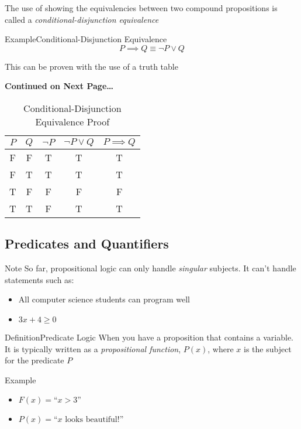 \documentclass{MathNotes}
\newenvironment{example}[1]{\begin{BlueBox}{Example}{#1}}{\end{BlueBox}}
\newenvironment{definition}[1]{\begin{RedBox}{Definition}{#1}}{\end{RedBox}}
\newenvironment{note}[1]{\begin{YellowBox}{Note}{#1}}{\end{YellowBox}}
\newcommand{\continued}{
	\mbox{}
	\vfill
	\textbf{Continued on Next Page\ldots}\newpage
}
\begin{document}
The use of showing the equivalencies between two compound propositions is called a
\textit{conditional-disjunction equivalence}
\begin{example}{Conditional-Disjunction Equivalence}\label{ex:conditional-disjunction-equivalence}
	\[P\implies Q\equiv\lnot P\lor Q\]
\end{example}

This can be proven with the use of a truth table 
\continued

\begin{table}[h!]\label{tab:conditional-disjunction-equivalence}
	\centering
	\caption{Conditional-Disjunction Equivalence Proof}
	\begin{tabular}{cc|c|c|c}
		$P$ & $Q$ & $\lnot P$ & $\lnot P\lor Q$ & $P\implies Q$ \\
		\midrule
		F   & F   & T         & T               & T             \\
		F   & T   & T         & T               & T             \\
		T   & F   & F         & F               & F             \\
		T   & T   & F         & T               & T             \\
	\end{tabular}
\end{table}

\subsection{Predicates and Quantifiers}\label{sec:predicates-quantifiers}

\begin{note}{}
	So far, propositional logic can only handle \textit{singular} subjects. It can't handle statements such as:
	\begin{itemize}
		\item All computer science students can program well
		\item $3x+4\geq0$
	\end{itemize}
\end{note}

\begin{multicols}{2}
	\begin{definition}{Predicate Logic}\label{def:pred-logic}
		When you have a proposition that contains a variable. It is typically written as a \textit{propositional function}, $P(x)$, where $x$ is the subject for the predicate $P$
	\end{definition}

	\begin{example}{}\label{ex:pred-logic}
		\begin{itemize}
			\item $F(x)=\text{``}x>3\text{''}$
			\item $P(x)=\text{``}x\text{ looks beautiful!''}$
		\end{itemize}
	\end{example}
\end{multicols}
\end{document}
